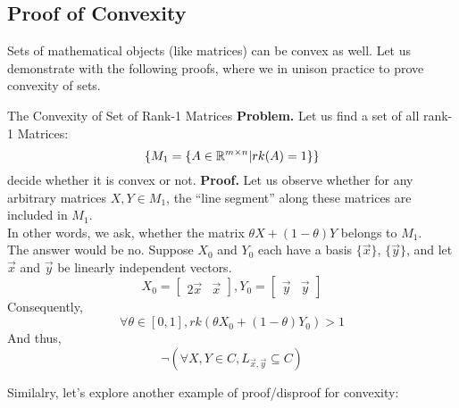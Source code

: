 \subsection{Proof of Convexity}
Sets of mathematical objects (like matrices) can be convex as well.
Let us demonstrate with the following proofs, where we in unison practice to prove convexity of sets.
\begin{ln-explain}{The Convexity of Set of Rank-1 Matrices}{}
    \textbf{Problem.} Let us find a set of all rank-1 Matrices:
    \[
        \{M_1 = \{A \in \mathbb{R}^{m \times n} | rk(A) = 1\}\}
    \]
    decide whether it is convex or not.
    \tcblower
    \textbf{Proof.}
    Let us observe whether for any arbitrary matrices $X, Y \in M_1$, the ``line segment'' along these matrices are included in $M_1$. \\
    In other words, we ask, whether the matrix $\theta X + (1 - \theta) Y$ belongs to $M_1$. \\
    The answer would be no. Suppose $X_0$ and $Y_0$ each have a basis $\{\vec{x}\}$, $\{\vec{y}\}$, and let $\vec{x}$ and $\vec{y}$ be linearly independent vectors.
    \[
        X_0 = \begin{bmatrix} 2 \vec{x} & \vec{x} \end{bmatrix},
        Y_0 = \begin{bmatrix} \vec{y} & \vec{y} \end{bmatrix}
    \]
    Consequently,
    \[
        \forall \theta \in [0, 1], rk(\theta X_0 + (1 - \theta) Y_0) > 1
    \]
    And thus,
    \[
        \neg (\forall X, Y \in C, L_{\vec{x}, \vec{y}} \subseteq C)
    \]
\end{ln-explain}
Similalry, let's explore another example of proof/disproof for convexity:
